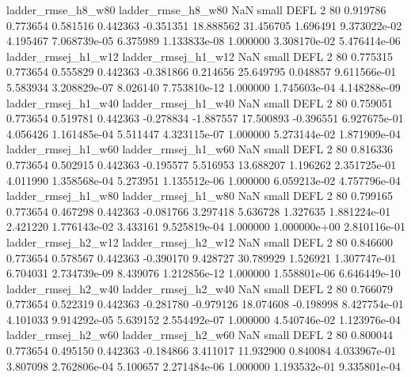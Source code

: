       ladder_rmse_h8_w80       ladder_rmse_h8_w80                   NaN      small     DEFL                 2 80 0.919786       0.773654 0.581516       0.442363   -0.351351     18.888562     31.456705     1.696491   9.373022e-02  4.195467 7.068739e-05     6.375989   1.133833e-08            1.000000    3.308170e-02        5.476414e-06
     ladder_rmsej_h1_w12      ladder_rmsej_h1_w12                   NaN      small     DEFL                 2 80 0.775315       0.773654 0.555829       0.442363   -0.381866      0.214656     25.649795     0.048857   9.611566e-01  5.583934 3.208829e-07     8.026140   7.753810e-12            1.000000    1.745603e-04        4.148288e-09
     ladder_rmsej_h1_w40      ladder_rmsej_h1_w40                   NaN      small     DEFL                 2 80 0.759051       0.773654 0.519781       0.442363   -0.278834     -1.887557     17.500893    -0.396551   6.927675e-01  4.056426 1.161485e-04     5.511447   4.323115e-07            1.000000    5.273144e-02        1.871909e-04
     ladder_rmsej_h1_w60      ladder_rmsej_h1_w60                   NaN      small     DEFL                 2 80 0.816336       0.773654 0.502915       0.442363   -0.195577      5.516953     13.688207     1.196262   2.351725e-01  4.011990 1.358568e-04     5.273951   1.135512e-06            1.000000    6.059213e-02        4.757796e-04
     ladder_rmsej_h1_w80      ladder_rmsej_h1_w80                   NaN      small     DEFL                 2 80 0.799165       0.773654 0.467298       0.442363   -0.081766      3.297418      5.636728     1.327635   1.881224e-01  2.421220 1.776143e-02     3.433161   9.525819e-04            1.000000    1.000000e+00        2.810116e-01
     ladder_rmsej_h2_w12      ladder_rmsej_h2_w12                   NaN      small     DEFL                 2 80 0.846600       0.773654 0.578567       0.442363   -0.390170      9.428727     30.789929     1.526921   1.307747e-01  6.704031 2.734739e-09     8.439076   1.212856e-12            1.000000    1.558801e-06        6.646449e-10
     ladder_rmsej_h2_w40      ladder_rmsej_h2_w40                   NaN      small     DEFL                 2 80 0.766079       0.773654 0.522319       0.442363   -0.281780     -0.979126     18.074608    -0.198998   8.427754e-01  4.101033 9.914292e-05     5.639152   2.554492e-07            1.000000    4.540746e-02        1.123976e-04
     ladder_rmsej_h2_w60      ladder_rmsej_h2_w60                   NaN      small     DEFL                 2 80 0.800044       0.773654 0.495150       0.442363   -0.184866      3.411017     11.932900     0.840084   4.033967e-01  3.807098 2.762806e-04     5.100657   2.271484e-06            1.000000    1.193532e-01        9.335801e-04
